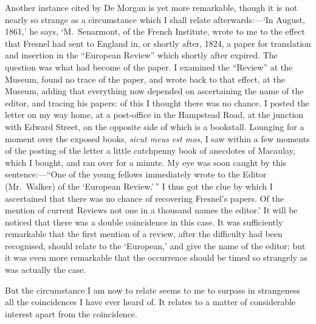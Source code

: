 \documentclass[letterpaper,12pt,oneside,openany]{memoir}
\begin{document}
Another instance cited by De Morgan is yet more
remarkable, though it is not nearly so strange as a
circumstance which I shall relate afterwards:---`In
August, 1861,' he says, `M.~Senarmont, of the French
Institute, wrote to me to the effect that Fresnel had
sent to England in, or shortly after, 1824, a paper for
translation and insertion in the ``European Review''
which shortly after expired. The question was what
had become of the paper. I examined the ``Review'' at
the Museum, found no trace of the paper, and wrote
back to that effect, at the Museum, adding that everything
now depended on ascertaining the name of the
editor, and tracing his papers: of this I thought there
was no chance. I posted the letter on my way home,
at a post-office in the Hampstead Road, at the junction
with Edward Street, on the opposite side of which is a
bookstall. Lounging for a moment over the exposed
books, \textit{sicut meus est mos}, I saw within a few moments of
the posting of the letter a little catchpenny book of anecdotes
of Macaulay, which I bought, and ran over for
a minute. My eye was soon caught by this sentence:---``One
of the young fellows immediately wrote to the
Editor (Mr.~Walker) of the `European Review.'\,'' I thus
got the clue by which I ascertained that there was no
chance of recovering Fresnel's papers. Of the mention
of current Reviews not one in a thousand names the
editor.' It will be noticed that there was a double coincidence
in this case. It was sufficiently remarkable
that the first mention of a review, after the difficulty
had been recognised, should relate to the `European,'
and give the name of the editor; but it was even more
remarkable that the occurrence should be timed so
strangely as was actually the case.

But the circumstance I am now to relate seems to
me to surpass in strangeness all the coincidences I have
ever heard of. It relates to a matter of considerable
interest apart from the coincidence.
\end{document}
